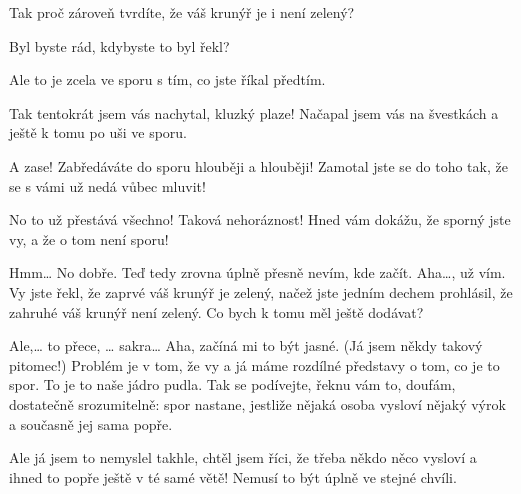 \documentclass[12pt]{article}
\begin{document}
\begin{description}[itemsep=0pt]
\item[A::] Tak proč zároveň tvrdíte, že váš krunýř je i není zelený?

\item[Ž:]

\item[A:] Byl byste rád, kdybyste to byl řekl?

\item[Ž:]

\item[A:] Ale to je zcela ve sporu s tím, co jste říkal předtím.

\item[Ž:]

\item[A:] Tak tentokrát jsem vás nachytal, kluzký plaze! Načapal jsem vás na švestkách
    a ještě k tomu po uši ve sporu.

\item[Ž:]

\item[A:] A zase! Zabředáváte do sporu hlouběji a hlouběji! Zamotal jste  se do toho
    tak, že se s vámi už nedá vůbec mluvit!

\item[Ž:]

\item[A:] No to už přestává všechno! Taková nehoráznost! Hned vám dokážu, že
    sporný jste vy, a že o tom není sporu!

\item[Ž:]

\item[A:] Hmm… No dobře. Teď tedy zrovna úplně přesně nevím, kde začít.
    Aha…, už vím. Vy jste řekl, že zaprvé váš krunýř je zelený, načež jste jedním
    dechem prohlásil, že zahruhé váš krunýř není zelený. Co bych k tomu měl
    ještě dodávat?

\item[Ž:]

\item[A:] Ale,… to přece, … sakra… Aha, začíná mi to být jasné. (Já jsem někdy takový
    pitomec!) Problém je v tom, že vy a já máme rozdílné představy o tom, co je to spor.
    To je to naše jádro pudla. Tak se podívejte, řeknu vám to, doufám, dostatečně
    srozumitelně: spor nastane, jestliže nějaká osoba vysloví nějaký výrok a současně
    jej sama popře.

\item[Ž:]

\item[A:] Ale já jsem to nemyslel takhle, chtěl jsem říci, že třeba někdo
    něco vysloví a ihned to popře ještě v té samé větě! Nemusí to být úplně ve stejné
    chvíli.


\end{description}
\end{document}
